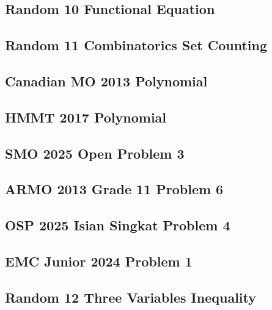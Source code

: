 \subsection{Random 10 Functional Equation}


\subsection{Random 11 Combinatorics Set Counting}


\subsection{Canadian MO 2013 Polynomial}


\subsection{HMMT 2017 Polynomial}


\subsection{SMO 2025 Open Problem 3}


\subsection{ARMO 2013 Grade 11 Problem 6}


\subsection{OSP 2025 Isian Singkat Problem 4}


\subsection{EMC Junior 2024 Problem 1}


\subsection{Random 12 Three Variables Inequality}


